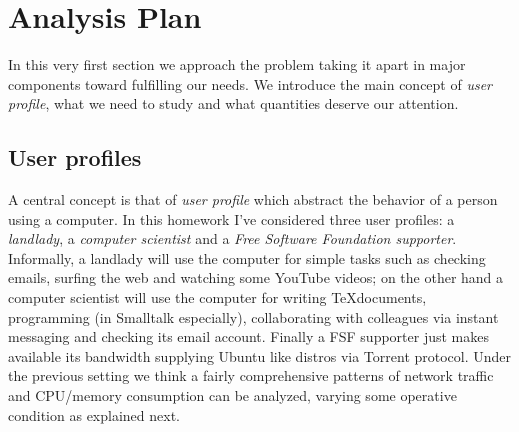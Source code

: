 \documentclass[10pt,a4paper]{article}
\begin{document}
\title{\rmfamily\normalfont{}} \author{\\} \date{\today}
    
    \maketitle

    \begin{abstract}
      This article collects the work I did in order to support my
      Quantitative Systems Analysis exam. The goal is to study
      resources usage respect a collection of user profiles, each one
      of them producing different network traffic and CPU/memory
      consumption patterns in different time windows. I performed some
      experiments repeating them over time, analyzing results with a
      piece of Smalltalk software, initially implemented for the
      problem at hand, but it turns out to be far more general.
    \end{abstract}
       
    \tableofcontents
   
 
    \newpage

    \section{Analysis Plan}
    
    In this very first section we approach the problem taking it apart
    in major components toward fulfilling our needs. We introduce the
    main concept of \emph{user profile}, what we need to study and
    what quantities deserve our attention.

    \subsection{User profiles}
    A central concept is that of \emph{user profile} which abstract
    the behavior of a person using a computer. In this homework I've
    considered three user profiles: a \emph{landlady}, a
    \emph{computer scientist} and a \emph{Free Software Foundation
      supporter}. Informally, a landlady will use the computer for
    simple tasks such as checking emails, surfing the web and watching
    some YouTube videos; on the other hand a computer scientist will
    use the computer for writing \TeX documents, programming (in
    Smalltalk especially), collaborating with colleagues via instant
    messaging and checking its email account. Finally a FSF supporter
    just makes available its bandwidth supplying Ubuntu like distros
    via Torrent protocol. Under the previous setting we think a fairly
    comprehensive patterns of network traffic and CPU/memory
    consumption can be analyzed, varying some operative condition as
    explained next.
\end{document}
